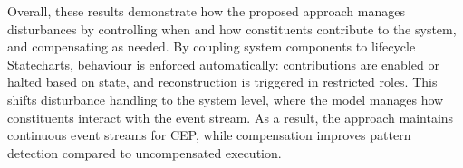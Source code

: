 Overall, these results demonstrate how the proposed approach manages disturbances by controlling when and how constituents contribute to the system, and compensating as needed. By coupling system components to lifecycle Statecharts, behaviour is enforced automatically: contributions are enabled or halted based on state, and reconstruction is triggered in restricted roles. This shifts disturbance handling to the system level, where the model manages how constituents interact with the event stream. As a result, the approach maintains continuous event streams for CEP, while compensation improves pattern detection compared to uncompensated execution.